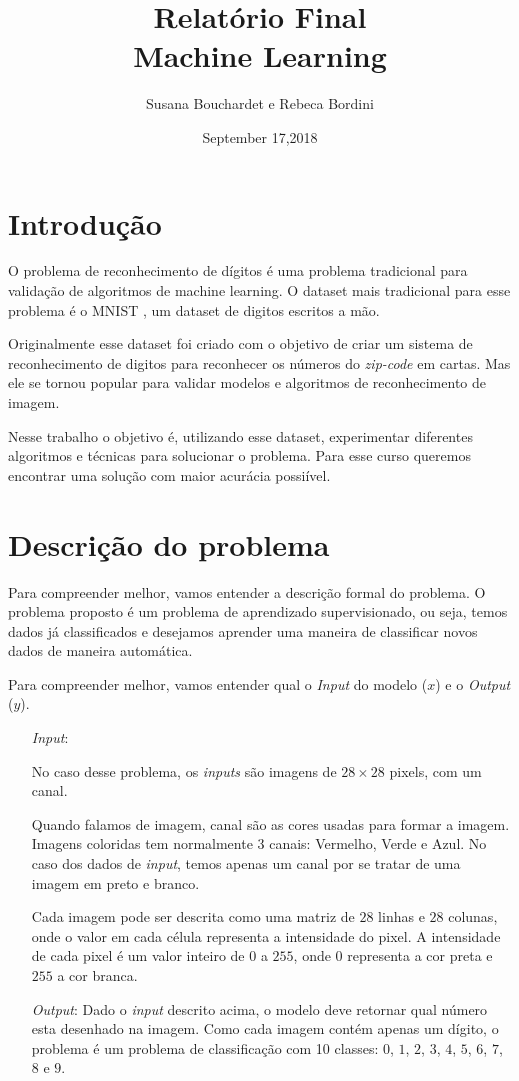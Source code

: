 \documentclass[a4paper,10pt]{article}
\title{Relatório Final \\ Machine Learning}
\date{September 17,2018}
\author{Susana Bouchardet e Rebeca Bordini}
\begin{document}
\maketitle

\section{Introdução}

O problema de reconhecimento de dígitos é uma problema tradicional para validação de algoritmos de machine learning. O dataset mais tradicional para esse problema é o MNIST \cite{lecun-mnisthandwrittendigit-2010}, um dataset de digitos escritos a mão.

Originalmente esse dataset foi criado com o objetivo de criar um sistema de reconhecimento de digitos para reconhecer os números do \textit{zip-code} em cartas. Mas ele se tornou popular para validar modelos e algoritmos de reconhecimento de imagem. 

Nesse trabalho o objetivo é, utilizando esse dataset, experimentar diferentes algoritmos e técnicas para solucionar o problema. Para esse curso queremos encontrar uma solução com maior acurácia possiível. 

\section{Descrição do problema}

Para compreender melhor, vamos entender a descrição formal do problema. O problema proposto é um problema de aprendizado supervisionado, ou seja, temos dados já classificados e desejamos aprender uma maneira de classificar novos dados de maneira automática.

Para compreender melhor, vamos entender qual o \textit{Input} do modelo ($x$) e o \textit{Output} ($y$).

\begin{enumerate}
 \item [\textit{Input}:] 
 
 No caso desse problema, os \textit{inputs} são imagens  de $28\times 28$ pixels, com um canal. 
 
 Quando falamos de imagem, canal são as cores usadas para formar a imagem. Imagens coloridas tem normalmente 3 canais: Vermelho, Verde e Azul. No caso dos dados de \textit{input}, temos apenas um canal por se tratar de uma imagem em preto e branco. 
 
 Cada imagem pode ser descrita como uma matriz de $28$ linhas e $28$ colunas, onde o valor em cada célula representa a intensidade do pixel. A intensidade de cada pixel é um valor inteiro de $0$ a $255$, onde $0$ representa a cor preta e $255$ a cor branca.
 
  \item [\textit{Output}:] Dado o \textit{input} descrito acima, o modelo deve retornar qual número esta desenhado na imagem. Como cada imagem contém apenas um dígito, o problema é um problema de classificação com 10 classes: $0$, $1$, $2$, $3$, $4$, $5$, $6$, $7$, $8$ e $9$.
\end{enumerate}
\end{document}
